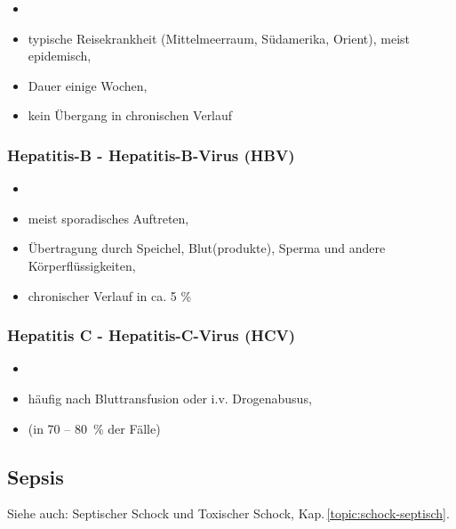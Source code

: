 \begin{itemize}
\item {}  
\item typische Reisekrankheit (Mittelmeerraum, S\"udamerika, Orient),
meist epidemisch, 
\item Dauer einige Wochen, 
\item kein \"Ubergang in chronischen Verlauf
\end{itemize}


\subsubsection{Hepatitis-B - Hepatitis-B-Virus (HBV)}

\begin{itemize}
\item {} 
\item meist sporadisches Auftreten, 
\item \"Ubertragung durch Speichel, Blut(produkte), Sperma und andere
K\"orperfl\"ussigkeiten, 
\item chronischer Verlauf in ca. 5 \%
\end{itemize}


\subsubsection{Hepatitis C - Hepatitis-C-Virus (HCV)}

\begin{itemize}
\item {} 
\item h\"aufig nach Bluttransfusion oder i.v. Drogenabusus, 
\item {} (in 70 -- 80~\% der
F\"alle)
\end{itemize}




\subsection{Sepsis}
\label{topic:sepsis}

Siehe auch: Septischer Schock und Toxischer Schock,
Kap.\,\ref{topic:schock-septisch}.

